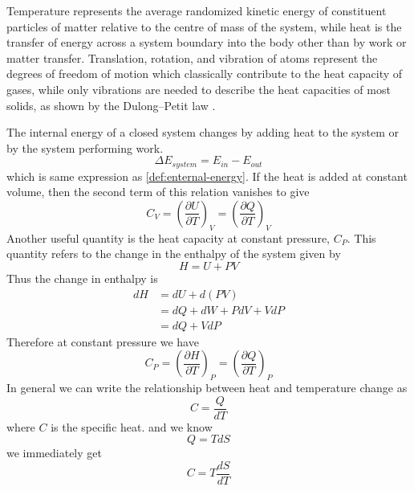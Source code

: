 	Temperature represents the average randomized kinetic energy of constituent particles of matter relative to the centre of mass of the system, while heat is the transfer of energy across a system boundary into the body other than by work or matter transfer. Translation, rotation, and vibration of atoms represent the degrees of freedom of motion which classically contribute to the heat capacity of gases, while only vibrations are needed to describe the heat capacities of most solids, as shown by the Dulong–Petit law \cite{Kittel2004}.
	
	
	The internal energy of a closed system changes by adding heat to the system or by the system performing work.
	\begin{equation}
		\Delta E_{system} = E_{in} - E_{out}
	\end{equation}
	which is same expression as \ref{def:enternal-energy}. If the heat is added at constant volume, then the second term of this relation vanishes to give
	\begin{equation}
		C_V = \left(\frac{\partial U}{\partial T}\right)_V = \left(\frac{\partial Q}{\partial T}\right)_V
	\end{equation}
	Another useful quantity is the heat capacity at constant pressure, $C_P$. This quantity refers to the change in the enthalpy of the system given by
	\begin{equation}
		H = U + PV
	\end{equation}
	Thus the change in enthalpy is 
	\begin{align}
		dH 
		&= dU + d(PV) \nonumber \\
		&= dQ + dW + PdV + VdP \nonumber \\
		&= dQ  + VdP
	\end{align}
	Therefore at constant pressure we have
	\begin{equation}
		C_P = \left(\frac{\partial H}{\partial T}\right)_P = \left(\frac{\partial Q}{\partial T}\right)_P
	\end{equation}
	In general we can write the relationship between heat and temperature change as
	\begin{equation}
		C = \frac{Q}{dT}
	\end{equation}
	 where $C$ is the specific heat.
	and we know
	\begin{equation}
		Q = T dS
	\end{equation}
	we immediately get
	\begin{equation}
		C = T \frac{dS}{dT}
		\label{def:specific-heat-thermodynamics}
	\end{equation}
	
